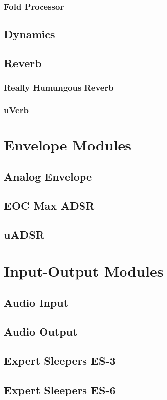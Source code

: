 \documentclass[11pt]{book}
\begin{document}
\subsection{Fold Processor}
\section{Dynamics}
\section{Reverb}
\subsection{Really Humungous Reverb}
\subsection{uVerb}

\chapter{Envelope Modules}
\section{Analog Envelope}
\section{EOC Max ADSR}
\section{uADSR}

\chapter{Input-Output Modules}
\section{Audio Input}
\section{Audio Output}
\section{Expert Sleepers ES-3}
\section{Expert Sleepers ES-6}
\end{document}
